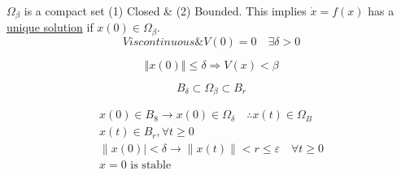 \noindent $\Omega_{\beta}$ is a compact set (1) Closed \& (2) Bounded. This implies $\dot{x}=f(x)$ has a \underline{unique solution} if $x(0) \in \Omega_{\beta}$. \\

$$
V is continuous \& V(0)=0 \quad \exists \delta > 0
$$

$$
\left\Vert x(0) \right\Vert \leq \delta \Rightarrow V(x) < \beta
$$

$$
B_{\delta} \subset \Omega_{\beta} \subset B_r
$$


$$
\begin{array}{l}
x(0) \in B_{8} \rightarrow x(0) \in \Omega_{\delta} \quad \therefore x(t) \in \Omega_{B} \\
x(t) \in B_{r}, \forall t \geq 0 \\
\|x(0) \mid<\delta \rightarrow\| x(t) \|<r \leqslant \varepsilon \quad \forall t \geq 0 \\
x=0 \text { is stable }
\end{array}
$$
